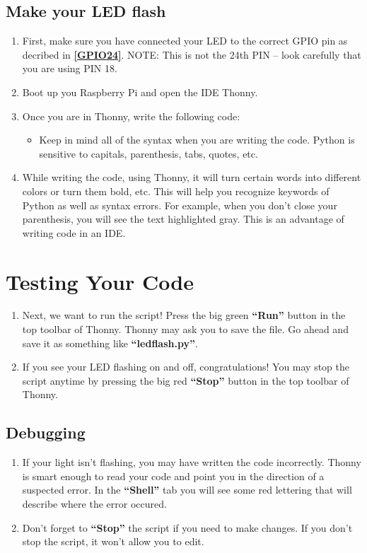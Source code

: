 \documentclass{article}\usepackage[]{graphicx}\usepackage[]{color}
\begin{document}
\subsection{Make your LED flash}

\begin{enumerate}
\item First, make sure you have connected your LED to the correct GPIO pin as decribed in \textbf{\ref{GPIO24}}. NOTE: This is not the 24th PIN -- look carefully that you are using PIN 18.
\item Boot up you Raspberry Pi and open the IDE Thonny.
\item Once you are in Thonny, write the following code: \newline

\begin{itemize}
\item Keep in mind all of the syntax when you are writing the code. Python is sensitive to capitals, parenthesis, tabs, quotes, etc.
\end{itemize}
\item While writing the code, using Thonny, it will turn certain words into different colors or turn them bold, etc. This will help you recognize keywords of Python as well as syntax errors. For example, when you don't close your parenthesis, you will see the text highlighted gray. This is an advantage of writing code in an IDE.
\end{enumerate}

\section{Testing Your Code}
\begin{enumerate}
\item Next, we want to run the script! Press the big green \textbf{``Run''} button in the top toolbar of Thonny. Thonny may ask you to save the file. Go ahead and save it as something like \textbf{``ledflash.py''}.
\item If you see your LED flashing on and off, congratulations! You may stop the script anytime by pressing the big red \textbf{``Stop''} button in the top toolbar of Thonny.
\end{enumerate}

\subsection{Debugging}
\begin{enumerate}
\item If your light isn't flashing, you may have written the code incorrectly. Thonny is smart enough to read your code and point you in the direction of a suspected error. In the \textbf{``Shell''} tab you will see some red lettering that will describe where the error occured.
\item Don't forget to \textbf{``Stop''} the script if you need to make changes. If you don't stop the script, it won't allow you to edit.
\end{enumerate}
\end{document}
